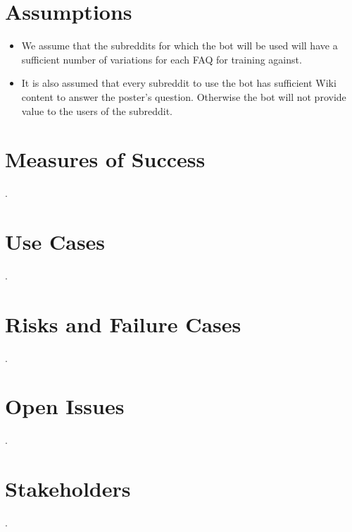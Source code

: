\documentclass[dvips,12pt]{article}
\begin{document}
\section{Assumptions}

\begin{itemize}
\item We assume that the subreddits for which the bot will be used will have a sufficient number of variations for each FAQ for training against.
\item It is also assumed that every subreddit to use the bot has sufficient Wiki content to answer the poster's question. Otherwise the bot will not provide value to the users of the subreddit.
\end{itemize}

\section{Measures of Success}

.

\section{Use Cases}

.

\section{Risks and Failure Cases}

.

\section{Open Issues}

.

\section{Stakeholders}

.




\end{document}
